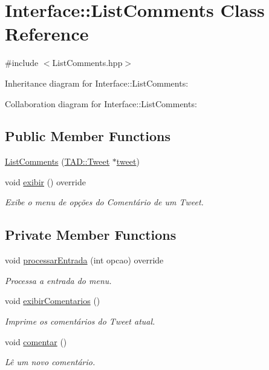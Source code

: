 \hypertarget{class_interface_1_1_list_comments}{}\section{Interface\+:\+:List\+Comments Class Reference}
\label{class_interface_1_1_list_comments}


{\ttfamily \#include $<$List\+Comments.\+hpp$>$}



Inheritance diagram for Interface\+:\+:List\+Comments\+:


Collaboration diagram for Interface\+:\+:List\+Comments\+:
\subsection*{Public Member Functions}
\begin{DoxyCompactItemize}
\item 
\hyperlink{class_interface_1_1_list_comments_aed618ace7a52bd5b4ab7f61e233f8251}{List\+Comments} (\hyperlink{class_t_a_d_1_1_tweet}{T\+A\+D\+::\+Tweet} $\ast$\hyperlink{class_interface_1_1_list_comments_a4d7e333288fc27c09172b7d98344d02c}{tweet})
\item 
void \hyperlink{class_interface_1_1_list_comments_a86ebab6e64dc979fd0f21bbeb142ec55}{exibir} () override
\begin{DoxyCompactList}\small\item\em Exibe o menu de opções do Comentário de um Tweet. \end{DoxyCompactList}\end{DoxyCompactItemize}
\subsection*{Private Member Functions}
\begin{DoxyCompactItemize}
\item 
void \hyperlink{class_interface_1_1_list_comments_a5b02d2e6a845fd356bfc7d4e418b9c3c}{processar\+Entrada} (int opcao) override
\begin{DoxyCompactList}\small\item\em Processa a entrada do menu. \end{DoxyCompactList}\item 
void \hyperlink{class_interface_1_1_list_comments_aa7b53cad1822bd5b2fc131e1a48271cb}{exibir\+Comentarios} ()
\begin{DoxyCompactList}\small\item\em Imprime os comentários do Tweet atual. \end{DoxyCompactList}\item 
void \hyperlink{class_interface_1_1_list_comments_a18a4829f8ee9639d6395b1789613b797}{comentar} ()
\begin{DoxyCompactList}\small\item\em Lê um novo comentário. \end{DoxyCompactList}\end{DoxyCompactItemize}
